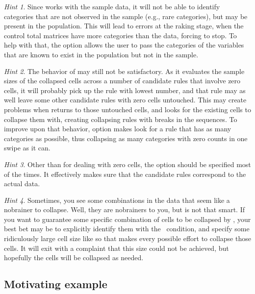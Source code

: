 \textit{Hint 1}. Since  works with the sample data,
it will not be able to identify categories that are not observed in the sample (e.g., rare categories),
but may be present in the population. This will lead to errors at the raking stage,
when the control total matrices have more categories than the data, forcing  to stop.
To help with that, the option  allows the user to pass the categories
of the variables that are known to exist in the population but not in the sample.

\textit{Hint 2}. The behavior of  may still not be
satisfactory. As it evaluates the sample sizes of the collapsed cells across a number
of candidate rules that involve zero cells, it will probably pick up the rule with lowest
number, and that rule may as well leave some other candidate rules with zero cells untouched.
This may create problems when  returns to those untouched cells,
and looks for the existing cells to collapse them with, creating collapsing rules with breaks
in the sequences. To improve upon that behavior, option  makes
 look for a rule that has as many categories as possible, thus collapsing
as many categories with zero counts in one swipe as it can.

\textit{Hint 3}. Other than for dealing with zero cells, the option  should be specified
most of the times. It effectively makes sure that the candidate rules correspond to the actual data.

\textit{Hint 4}. Sometimes, you see some combinations in the data that seem like a nobrainer
to collapse. Well, they are nobrainers to you, but  is not that smart.
If you want to guarantee some specific combination of cells to be collapsed by ,
your best bet may be to explicitly identify them with the \ifexp\ condition, and specify some
ridiculously large cell size like  so that  makes every possible
effort to collapse those cells. It will exit with a complaint that this size could not be achieved,
but hopefully the cells will be collapsed as needed.

\subsection{Motivating example}
\label{subsec:example}

